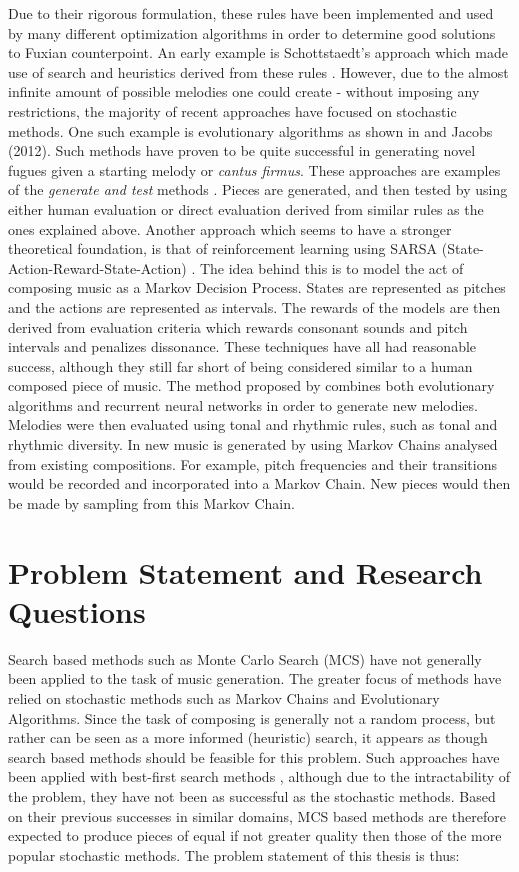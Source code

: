 \documentclass[master.tex]{subfiles} %
\begin{document}
Due to their rigorous formulation, these rules have been implemented and used by many different optimization algorithms in order to determine good solutions to Fuxian counterpoint. An early example is Schottstaedt's approach which made use of search and heuristics derived from these rules . However, due to the almost infinite amount of possible melodies one could create - without imposing any restrictions, the majority of recent approaches have focused on stochastic methods. One such example is evolutionary algorithms as shown in  and Jacobs (2012). Such methods have proven to be quite successful in generating novel fugues given a starting melody or \emph{cantus firmus}. These approaches are examples of the \emph{generate and test} methods . Pieces are generated, and then tested by using either human evaluation or direct evaluation derived from similar rules as the ones explained above.
Another approach which seems to have a stronger theoretical foundation, is that of reinforcement learning using SARSA (State-Action-Reward-State-Action) . The idea behind this is to model the act of composing music as a Markov Decision Process. States are represented as pitches and the actions are represented as intervals. The rewards of the models are then derived from evaluation criteria which rewards consonant sounds and pitch intervals and penalizes dissonance.  These techniques have all had reasonable success, although they still far short of being considered similar to a human composed piece of music. 
The method proposed by  combines both evolutionary algorithms and recurrent neural networks in order to generate new melodies. Melodies were then evaluated using tonal and rhythmic rules, such as tonal and rhythmic diversity. 
In  new music is generated by using Markov Chains analysed from existing compositions. For example, pitch frequencies and their transitions would be recorded and incorporated into a Markov Chain. New pieces would then be made by sampling from this Markov Chain. 

\section{Problem Statement and Research Questions}
Search based methods such as Monte Carlo Search (MCS) have not generally been applied to the task of music generation. The greater focus of methods have relied on stochastic methods such as Markov Chains and Evolutionary Algorithms. Since the task of composing is generally not a random process, but rather can be seen as a more informed (heuristic) search, it appears as though search based methods should be feasible for this problem. Such approaches have been applied with best-first search methods , although due to the intractability of the problem, they have not been as successful as the stochastic methods. Based on their previous successes in similar domains, MCS based methods are therefore expected to produce pieces of equal if not greater quality then those of the more popular stochastic methods. The problem statement of this thesis is thus: 
\end{document}
